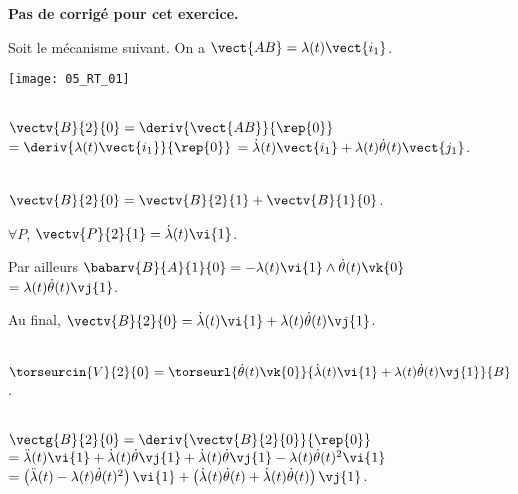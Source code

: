 \normaltrue
\correctionfalse


\setcounter{numques}{0}
\ifcorrection
\else
\textbf{Pas de corrigé pour cet exercice.}
\fi

\ifprof
\else
Soit le mécanisme suivant. On a $\vect{AB}=\lambda(t)\vect{i_1}$.
\begin{center}
\texttt{[image: 05\_RT\_01]}
\end{center}
\fi

\ifprof  ~\\
$\vectv{B}{2}{0} = \deriv{\vect{AB}}{\rep{0}}$ $=\deriv{\lambda(t)\vect{i_1}}{\rep{0}}$
$=\dot{\lambda}(t)\vect{i_1}+\lambda(t)\dot{\theta}(t)\vect{j_1}$.
\else
\fi


\ifprof ~\\
$\vectv{B}{2}{0}=\vectv{B}{2}{1}+\vectv{B}{1}{0}$.

$\forall P$, $\vectv{P}{2}{1}=\dot{\lambda}(t)\vi{1}$.

Par ailleurs $\babarv{B}{A}{1}{0}=-\lambda(t)\vi{1}\wedge\dot{\theta}(t)\vk{0}$
$=\lambda(t)\dot{\theta}(t)\vj{1}$.

Au final, $\vectv{B}{2}{0}=\dot{\lambda}(t)\vi{1}+\lambda(t)\dot{\theta}(t)\vj{1}$.

\else
\fi

\ifprof  ~\\
$\torseurcin{V}{2}{0} = \torseurl{\dot{\theta}(t)\vk{0}}{\dot{\lambda}(t)\vi{1}+\lambda(t)\dot{\theta}(t)\vj{1}}{B}$.
\else
\fi

\ifprof  ~\\
$\vectg{B}{2}{0} = \deriv{\vectv{B}{2}{0}}{\rep{0}}$
$ = \ddot{\lambda}(t)\vi{1}+  \dot{\lambda}(t)\dot{\theta}\vj{1}+\dot{\lambda}(t)\dot{\theta}\vj{1}-\lambda(t)\dot{\theta}(t)^2\vi{1}$
$ = \left( \ddot{\lambda}(t)-\lambda(t)\dot{\theta}(t)^2\right)\vi{1}  +  \left( \dot{\lambda}(t)\dot{\theta}(t) +\dot{\lambda}(t)\dot{\theta}(t)\right) \vj{1}$.
\else
\fi


